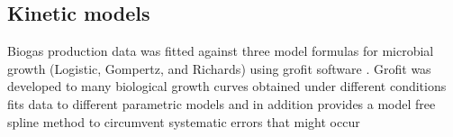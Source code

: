 \subsection{Kinetic models}
Biogas production data was fitted against three model formulas for microbial growth (Logistic, Gompertz, and Richards) using grofit software \cite{Kahm_2010}. Grofit was developed to  many biological growth curves obtained under different conditions fits data to different parametric models and in
addition provides a model free spline method to circumvent systematic errors that might
occur